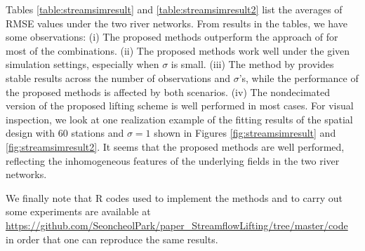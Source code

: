 \documentclass[11pt,titlepage]{article}
\begin{document}
Tables \ref{table:streamsimresult} and \ref{table:streamsimresult2} list the averages of RMSE values under the two river networks. From results in the tables, we have some observations: (i) The proposed methods outperform the approach of \cite{ODonnell2014} for most of the combinations. (ii) The proposed methods work well under the given simulation settings, especially when $\sigma$ is small. (iii) The method by \cite{ODonnell2014} provides stable results across the number of observations and $\sigma$'s, while the performance of the proposed methods is affected by both scenarios. (iv) The nondecimated version of the proposed lifting scheme is well performed in most cases. 
For visual inspection, we look at one realization example of the fitting results of the spatial design with 60 stations and $\sigma=1$ shown in Figures \ref{fig:streamsimresult} and \ref{fig:streamsimresult2}. It seems that the proposed methods are well performed, reflecting the inhomogeneous features of the underlying fields in the two river networks.   

We finally note that R codes used to implement the methods and to carry out some experiments are available at \url{https://github.com/SeoncheolPark/paper_StreamflowLifting/tree/master/code} in order that one can reproduce the same results. 
\end{document}

